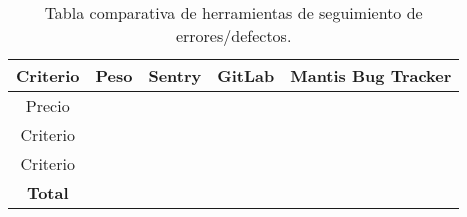 \begin{table}[H]
	\begin{center}
		\begin{tabular}{|c||c|c|c|c|}
			\hline
			Criterio & Peso & Sentry & GitLab & Mantis Bug Tracker \\
			\hline \hline
			Precio &  &  &  &  \\ \hline
			Criterio &  &  &  &  \\ \hline
			Criterio &  &  &  &  \\ \hline
			\textbf{Total} & \textbf{} & \textbf{} & \textbf{} & \textbf{} \\ \hline
		\end{tabular}
		\caption{Tabla comparativa de herramientas de seguimiento de errores/defectos.}
		\label{tabla:tabla5}
	\end{center}
\end{table}




%
%

       
